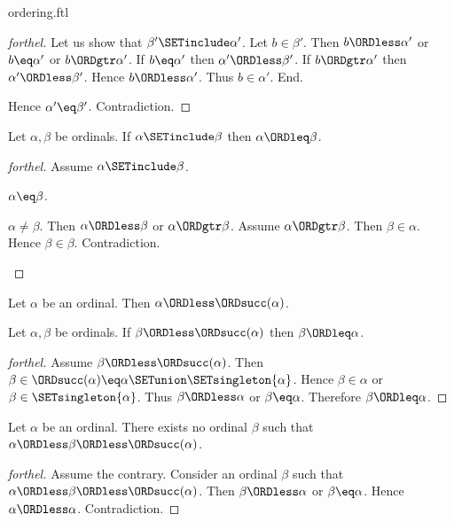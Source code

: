 \documentclass{naproche-library}
\begin{document}
\begin{smodule}[title=The Standard Ordering of the Ordinals]{ordering.ftl}
\begin{proof}[forthel]
  Let us show that $\beta' \SETinclude \alpha'$.
    Let $b \in \beta'$.
    Then $b \ORDless \alpha'$ or $b \eq \alpha'$ or $b \ORDgtr \alpha'$.
    If $b \eq \alpha'$ then $\alpha' \ORDless \beta'$.
    If $b \ORDgtr \alpha'$ then $\alpha' \ORDless \beta'$.
    Hence $b \ORDless \alpha'$.
    Thus $b \in \alpha'$.
  End.

  Hence $\alpha' \eq \beta'$.
  Contradiction.
\end{proof}

\begin{proposition}[forthel,id=SET_THEORY_02_610496856195072]
  Let $\alpha, \beta$ be ordinals.
  If $\alpha \SETinclude \beta$ then $\alpha \ORDleq \beta$.
\end{proposition}
\begin{proof}[forthel]
  Assume $\alpha \SETinclude \beta$.

  \begin{case}{$\alpha \eq \beta$.} \end{case}

  \begin{case}{$\alpha \neq \beta$.}
    Then $\alpha \ORDless \beta$ or $\alpha \ORDgtr \beta$.
    Assume $\alpha \ORDgtr \beta$.
    Then $\beta \in \alpha$.
    Hence $\beta \in \beta$.
    Contradiction.
  \end{case}
\end{proof}

\begin{proposition}[forthel,id=SET_THEORY_02_5689190964527104]
  Let $\alpha$ be an ordinal.
  Then $\alpha \ORDless \ORDsucc(\alpha)$.
\end{proposition}

\begin{proposition}[forthel,id=SET_THEORY_02_4064972025888768]
  Let $\alpha, \beta$ be ordinals.
  If $\beta \ORDless \ORDsucc(\alpha)$ then $\beta \ORDleq \alpha$.
\end{proposition}
\begin{proof}[forthel]
  Assume $\beta \ORDless \ORDsucc(\alpha)$.
  Then $\beta \in \ORDsucc(\alpha) \eq \alpha \SETunion \SETsingleton{\alpha}$.
  Hence $\beta \in \alpha$ or $\beta \in \SETsingleton{\alpha}$.
  Thus $\beta \ORDless \alpha$ or $\beta \eq \alpha$.
  Therefore $\beta \ORDleq \alpha$.
\end{proof}

\begin{proposition}[forthel,id=SET_THEORY_02_8242798790705152]
  Let $\alpha$ be an ordinal.
  There exists no ordinal $\beta$ such that $\alpha \ORDless \beta \ORDless \ORDsucc(\alpha)$.
\end{proposition}
\begin{proof}[forthel]
  Assume the contrary.
  Consider an ordinal $\beta$ such that $\alpha \ORDless \beta \ORDless \ORDsucc(\alpha)$.
  Then $\beta \ORDless \alpha$ or $\beta \eq \alpha$.
  Hence $\alpha \ORDless \alpha$.
  Contradiction.
\end{proof}


\end{smodule}
\end{document}
